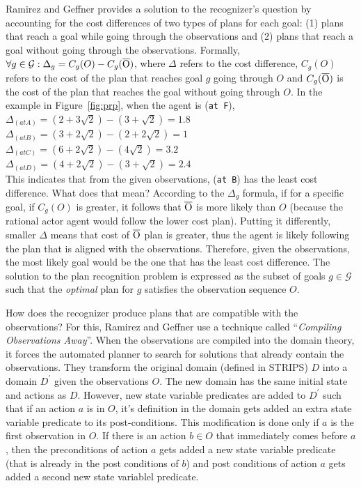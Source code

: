 Ramirez and Geffner provides a solution to the recognizer's question by accounting for the cost differences of two types of plans for each goal: (1) plans that reach a goal while going through the observations and (2) plans that reach a goal without going through the observations. Formally,
$\forall g \in \mathcal{G}: \Delta_{g} = C_g(O) - C_g(\overline{\rm O})$, where $\Delta$ refers to the cost difference, $C_g(O)$ refers to the cost of the plan that reaches goal $g$ going through $O$ and $C_g(\overline{\rm O})$ is the cost of the plan that reaches the goal without going through $O$. In the example in Figure~\ref{fig:prp}, when the agent is (\texttt{at F}),\\
$\Delta_{(at A)}= (2+3\sqrt{2}) - (3+\sqrt{2})=1.8$\\
$\Delta_{(at B)}= (3+2\sqrt{2}) - (2+2\sqrt{2})=1$\\
$\Delta_{(at C)}= (6+2\sqrt{2}) - (4\sqrt{2})=3.2$\\
$\Delta_{(at D)}= (4+2\sqrt{2}) - (3+\sqrt{2})=2.4$\\
This indicates that from the given observations, (\texttt{at B}) has the least cost difference. What does that mean? According to the $\Delta_g$ formula, if for a specific goal, if $C_g(O)$ is greater, it follows that $\overline{\rm O}$ is more likely than $O$ (because the rational actor agent would follow the lower cost plan). Putting it differently, smaller $\Delta$ means that cost of $\overline{\rm O}$ plan is greater, thus the agent is likely following the plan that is aligned with the observations. Therefore, given the observations, the most likely goal would be the one that has the least cost difference. The solution to the plan recognition problem is expressed as the subset of goals $g\in \mathcal{G}$ such that the \textit{optimal} plan for $g$ satisfies the observation sequence $O$.

How does the recognizer produce plans that are compatible with the observations? For this, Ramirez and Geffner use a technique called ``\textit{Compiling Observations Away}''. When the observations are compiled into the domain theory, it forces the automated planner to search for solutions that already contain the observations. They transform the original domain (defined in STRIPS) $D$ into a domain $D^\prime$ given the observations $O$. The new domain has the same initial state and actions as $D$. However, new state variable predicates are added to $D^\prime$ such that if an action $a$ is in $O$, it's definition in the domain gets added an extra state variable predicate to its post-conditions. This modification is done only if $a$ is the first observation in $O$. If there is an action $b \in O$ that immediately comes before $a$, then the preconditions of action $a$ gets added a new state variable predicate (that is already in the post conditions of $b$) and post conditions of action $a$ gets added a second new state variablel predicate.

